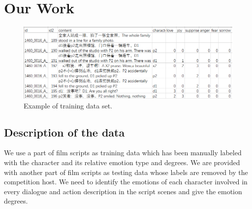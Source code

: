 \documentclass[12pt,twocolumn,letterpaper]{article}
\begin{document}
 

\section{Our Work}
\begin{figure}
\begin{center}
\includegraphics[scale=0.8]{data_sample.png}
\end{center}
   \caption{Example of training data set.}
\label{fig:short}
\end{figure}
\subsection{Description of the data}
 We use a part of film scripts as training data which has been manually labeled with the character and its relative emotion type and degrees. We are provided with another part of film scripts as testing data whose labels are removed by the competition host.  We need to identify the emotions of each character involved in every dialogue and action description in the script scenes and give the emotion degrees.
\end{document}
